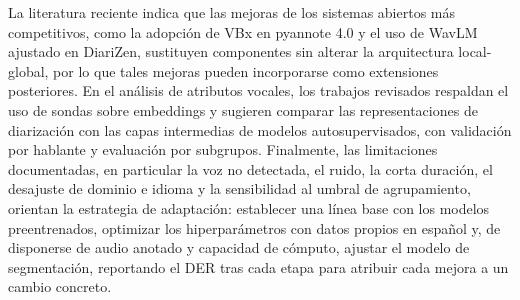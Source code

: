 \documentclass[11pt,a4paper]{article}
\begin{document}
La literatura reciente indica que las mejoras de los sistemas abiertos más competitivos, como la adopción de VBx en pyannote 4.0 y el uso de WavLM ajustado en DiariZen, sustituyen componentes sin alterar la arquitectura local-global, por lo que tales mejoras pueden incorporarse como extensiones posteriores. En el análisis de atributos vocales, los trabajos revisados respaldan el uso de sondas sobre embeddings y sugieren comparar las representaciones de diarización con las capas intermedias de modelos autosupervisados, con validación por hablante y evaluación por subgrupos. Finalmente, las limitaciones documentadas, en particular la voz no detectada, el ruido, la corta duración, el desajuste de dominio e idioma y la sensibilidad al umbral de agrupamiento, orientan la estrategia de adaptación: establecer una línea base con los modelos preentrenados, optimizar los hiperparámetros con datos propios en español y, de disponerse de audio anotado y capacidad de cómputo, ajustar el modelo de segmentación, reportando el DER tras cada etapa para atribuir cada mejora a un cambio concreto.
\end{document}
